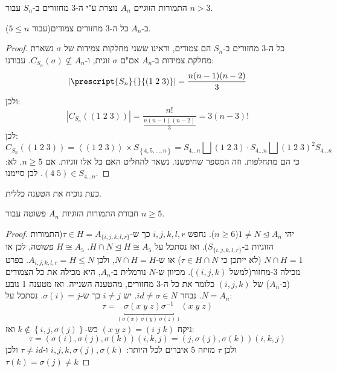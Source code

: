\documentclass{tstextbook}
\begin{document}
\begin{proposition}
התמורות הזוגיים \(A_{n}\) נוצרת ע"י ה-3 מחזורים ב-\(S_{n}\) עבור \(n>3\).

\end{proposition}
\begin{proposition}
ב-\(A_{n}\) כל ה-3 מחזורים צמודים(עבור \(5\leq n\)).

\end{proposition}
\begin{proof}
כל ה-3 מחזורים ב-\(S_{n}\) הם צמודים, וראינו ששני מחלקות צמידות
של \(\sigma\) נשארת מחלקת צמידות ב-\(A_{n}\) אם"ם \(\sigma\) זוגית,
ו-\(C_{S_{n}}\left( \sigma \right)\not\subseteq A_{n}\). עבורנו:
$$|\prescript{S_{n}}{}{\left( 1\;2\;3 \right)}|= \frac{n(n-1)(n-2)}{3}$$
ולכן:
$$|C_{S_{n}}\left( \left( 1\;2\;3 \right) \right)|= \frac{n!}{\frac{n(n-1)(n-2)}{3}}=3(n-3)!$$
לכן:
$$C_{S_{n}}\left( \left( 1\;2\;3 \right) \right)=\left\langle  \left( 1\;2\;3 \right) \right\rangle \times S_{\left\{  4,5,\dots,n  \right\}}=S_{4\dots n}\bigsqcup \left( 1\;2\;3 \right)\cdot S_{4\dots n}\bigsqcup \left( 1\;2\;3 \right)^2 S_{4\dots n}$$
כי הם מתחלפות. וזה המספר שחיפשנו. נשאר להחליט האם כל אלו זוגיות. אם \(n\geq 5\). לא: \(\left( 4\;5 \right)\in S_{4\dots n}\). לכן סיימנו.

\end{proof}
כעת נוכיח את הטענה כללית.

\begin{proposition}
חבורת התמורות הזוגיות \(A_{n}\) פשוטה עבור \(n\geq 5\).

\end{proposition}
\begin{proof}
יהי \(1\neq N\trianglelefteq A_{n}\)(\(n\geq 6\)). נחפש \(i,j,k,l,r\) כך ש-\(\tau \in H=A_{\{ i,j,k,l,r \}}\)(התמורות הזוגיות ב-\(S_{\{ i,j,k,l,r \}}\)). ואז נסתכל על \(H\cap N\trianglelefteq H\cong A_{5}\). \(H\cong A_{5}\) פשוטה, לכן או \(N\cap H=1\) (לא ייתכן כי \(\tau \in H\cap N\)) או ש-\(N\cap H=H\), ולכן \(A_{i,j,k,l,r}=H\leq N\). בפרט מכילה 3-מחזור(למשל \((i,j,k)\)). מכיוון ש-\(N\) נורמלית ב-\(A_{n}\), היא מכילה את כל הצמודים (ב-\(A_{n}\)) של \((i,j,k)\) כלומר את כל ה-3 מחזורים, מהטענה השנייה. ואז מטענה 1 נובע \(N=A_{n}\). נבחר \(id\neq \sigma \in N\). יש \(i\neq j\) כך ש-\(\sigma(i)=j\). נסתכל על:
$$\tau=\underbracket{ \sigma\left( x\;y\;z \right)\sigma ^{-1} }_{ \left( \sigma(x)\;\sigma(y)\;\sigma(z) \right) } \left( x\;y\;z \right)$$
ניקח \((x\;y\;z)=(i\;j\;k)\) כש-\(k\notin \left\{  i,j,\sigma(j)  \right\}\) ואז:
$$\tau=\left( \sigma(i),\sigma(j),\sigma(k) \right)(i,k,j)=\left( j, \sigma(j), \sigma(k) \right)(i,k,j)$$
ולכן \(\tau\) מזיזה 5 איברים לכל היותר: \(i,j,k,\sigma(j),\sigma(k)\) ו-\(\tau \neq id\) ולכן \(\tau(k)=\sigma(j)\neq k\)

\end{proof}
\end{document}
